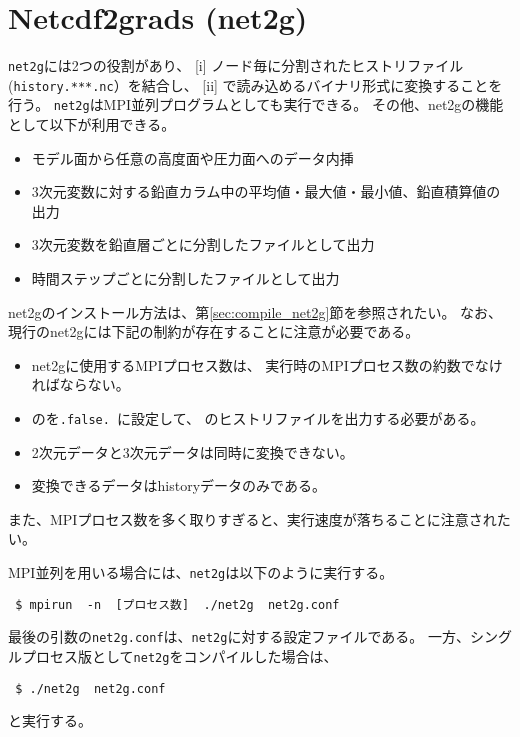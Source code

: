 \section{Netcdf2grads (net2g)} \label{sec:net2g}

\verb|net2g|には2つの役割があり、
[i] ノード毎に分割されたヒストリファイル(\verb|history.***.nc|）を結合し、
[ii] {\grads}で読み込めるバイナリ形式に変換することを行う。
\verb|net2g|はMPI並列プログラムとしても実行できる。
その他、net2gの機能として以下が利用できる。
%
\begin{itemize}
 \item モデル面から任意の高度面や圧力面へのデータ内挿
 \item 3次元変数に対する鉛直カラム中の平均値・最大値・最小値、鉛直積算値の出力
 \item 3次元変数を鉛直層ごとに分割したファイルとして出力
 \item 時間ステップごとに分割したファイルとして出力
\end{itemize}

net2gのインストール方法は、第\ref{sec:compile_net2g}節を参照されたい。
なお、現行のnet2gには下記の制約が存在することに注意が必要である。
\begin{itemize}
 \item net2gに使用するMPIプロセス数は、
\scalerm 実行時のMPIプロセス数の約数でなければならない。
\item {}のを\verb|.false. |に設定して、
\scalerm のヒストリファイルを出力する必要がある。
 \item 2次元データと3次元データは同時に変換できない。
 \item 変換できるデータはhistoryデータのみである。
\end{itemize}
また、MPIプロセス数を多く取りすぎると、実行速度が落ちることに注意されたい。


MPI並列を用いる場合には、\verb|net2g|は以下のように実行する。
\begin{verbatim}
 $ mpirun  -n  [プロセス数]  ./net2g  net2g.conf
\end{verbatim}
最後の引数の\verb|net2g.conf|は、\verb|net2g|に対する設定ファイルである。
一方、シングルプロセス版として\verb|net2g|をコンパイルした場合は、
\begin{verbatim}
 $ ./net2g  net2g.conf
\end{verbatim}
と実行する。

